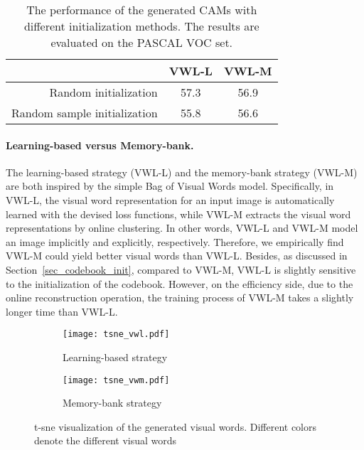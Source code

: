 \begin{table}[h]

  \caption{The performance of the generated CAMs with different initialization methods. The results are evaluated on the PASCAL VOC  set.}
  \label{tab_init_2}
  \centering
  \begin{tabular}{r|cc}
    \toprule
                                   & VWL-L & VWL-M \\ \midrule
    Random initialization          & 57.3  & 56.9  \\
    {Random sample} initialization & 55.8  & 56.6  \\ \bottomrule
  \end{tabular}
\end{table}



\paragraph{\textbf{Learning-based versus Memory-bank.}} The learning-based strategy (VWL-L) and the memory-bank strategy (VWL-M) are both inspired by the simple Bag of Visual Words model. Specifically, in VWL-L, the visual word representation for an input image is automatically learned with the devised loss functions, while VWL-M extracts the visual word representations by online clustering. In other words, VWL-L and VWL-M model an image implicitly and explicitly, respectively. Therefore, we empirically find VWL-M could yield better visual words than VWL-L. Besides, as discussed in Section~\ref{sec_codebook_init}, compared to VWL-M, VWL-L is slightly sensitive to the initialization of the codebook. However, on the efficiency side, due to the online reconstruction operation, the training process of VWL-M takes a slightly longer time than VWL-L. 

\begin{figure}[h]
  \centering
  \begin{subfigure}[b]{0.23\textwidth}
    \centering
    \texttt{[image: tsne\_vwl.pdf]}
    \caption{Learning-based strategy}
  \end{subfigure}
  \begin{subfigure}[b]{0.23\textwidth}
    \centering
    \texttt{[image: tsne\_vwm.pdf]}
    \caption{Memory-bank strategy}
  \end{subfigure}

  \caption{t-sne visualization of the generated visual words. Different colors denote the different visual words}
  \label{fig_tsne_1}
\end{figure}

